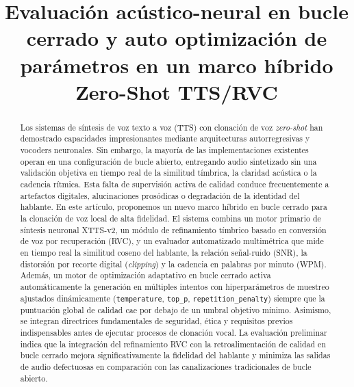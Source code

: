 \documentclass[conference]{IEEEtran}
\begin{document}
\title{Evaluación acústico-neural en bucle cerrado y auto optimización de parámetros en un marco híbrido Zero-Shot TTS/RVC}

\author{
}

\maketitle

\begin{abstract}
Los sistemas de síntesis de voz texto a voz (TTS) con clonación de voz \emph{zero-shot} han demostrado capacidades impresionantes mediante arquitecturas autorregresivas y vocoders neuronales. Sin embargo, la mayoría de las implementaciones existentes operan en una configuración de bucle abierto, entregando audio sintetizado sin una validación objetiva en tiempo real de la similitud tímbrica, la claridad acústica o la cadencia rítmica. Esta falta de supervisión activa de calidad conduce frecuentemente a artefactos digitales, alucinaciones prosódicas o degradación de la identidad del hablante. En este artículo, proponemos un nuevo marco híbrido en bucle cerrado para la clonación de voz local de alta fidelidad. El sistema combina un motor primario de síntesis neuronal XTTS-v2, un módulo de refinamiento tímbrico basado en conversión de voz por recuperación (RVC), y un evaluador automatizado multimétrica que mide en tiempo real la similitud coseno del hablante, la relación señal-ruido (SNR), la distorsión por recorte digital (\emph{clipping}) y la cadencia en palabras por minuto (WPM). Además, un motor de optimización adaptativo en bucle cerrado activa automáticamente la generación en múltiples intentos con hiperparámetros de muestreo ajustados dinámicamente (\texttt{temperature}, \texttt{top\_p}, \texttt{repetition\_penalty}) siempre que la puntuación global de calidad cae por debajo de un umbral objetivo mínimo. Asimismo, se integran directrices fundamentales de seguridad, ética y requisitos previos indispensables antes de ejecutar procesos de clonación vocal. La evaluación preliminar indica que la integración del refinamiento RVC con la retroalimentación de calidad en bucle cerrado mejora significativamente la fidelidad del hablante y minimiza las salidas de audio defectuosas en comparación con las canalizaciones tradicionales de bucle abierto.
\end{abstract}
\end{document}
